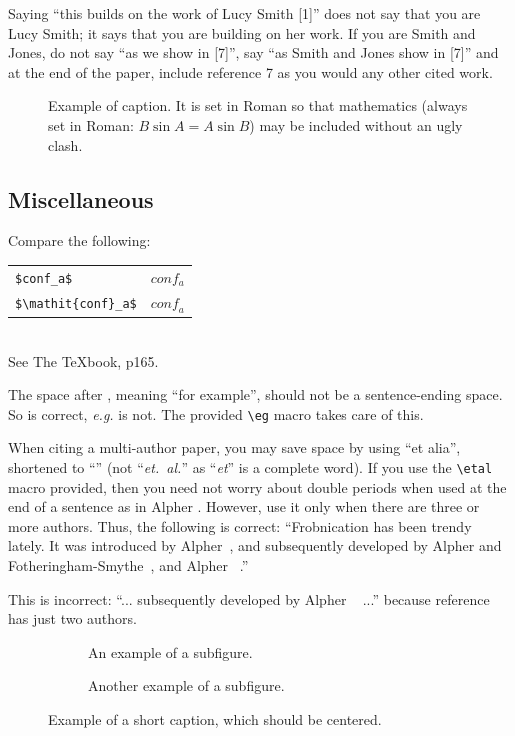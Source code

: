 Saying ``this builds on the work of Lucy Smith [1]'' does not say that you are Lucy Smith;
it says that you are building on her work.
If you are Smith and Jones, do not say ``as we show in [7]'', say ``as Smith and Jones show in [7]'' and at the end of the paper, include reference 7 as you would any other cited work.

\begin{figure}[t]
  \centering
  \fbox{\rule{0pt}{2in} \rule{0.9\linewidth}{0pt}}

   \caption{Example of caption.
   It is set in Roman so that mathematics (always set in Roman: $B \sin A = A \sin B$) may be included without an ugly clash.}
   \label{fig:onecol}
\end{figure}

\subsection{Miscellaneous}

\noindent
Compare the following:\\
\begin{tabular}{ll}
 \verb'$conf_a$' &  $conf_a$ \\
 \verb'$\mathit{conf}_a$' & $\mathit{conf}_a$
\end{tabular}\\
See The \TeX book, p165.

The space after \eg, meaning ``for example'', should not be a sentence-ending space.
So \eg is correct, {\em e.g.} is not.
The provided \verb'\eg' macro takes care of this.

When citing a multi-author paper, you may save space by using ``et alia'', shortened to ``\etal'' (not ``{\em et.\ al.}'' as ``{\em et}'' is a complete word).
If you use the \verb'\etal' macro provided, then you need not worry about double periods when used at the end of a sentence as in Alpher \etal.
However, use it only when there are three or more authors.
Thus, the following is correct:
   ``Frobnication has been trendy lately.
   It was introduced by Alpher~\cite{Alpher02}, and subsequently developed by
   Alpher and Fotheringham-Smythe~\cite{Alpher03}, and Alpher \etal~\cite{Alpher04}.''

This is incorrect: ``... subsequently developed by Alpher \etal~\cite{Alpher03} ...'' because reference~\cite{Alpher03} has just two authors.

\begin{figure}
  \centering
  \begin{subfigure}{0.68\linewidth}
    \fbox{\rule{0pt}{2in} \rule{.9\linewidth}{0pt}}
    \caption{An example of a subfigure.}
    \label{fig:short-a}
  \end{subfigure}
  \hfill
  \begin{subfigure}{0.28\linewidth}
    \fbox{\rule{0pt}{2in} \rule{.9\linewidth}{0pt}}
    \caption{Another example of a subfigure.}
    \label{fig:short-b}
  \end{subfigure}
  \caption{Example of a short caption, which should be centered.}
  \label{fig:short}
\end{figure}
